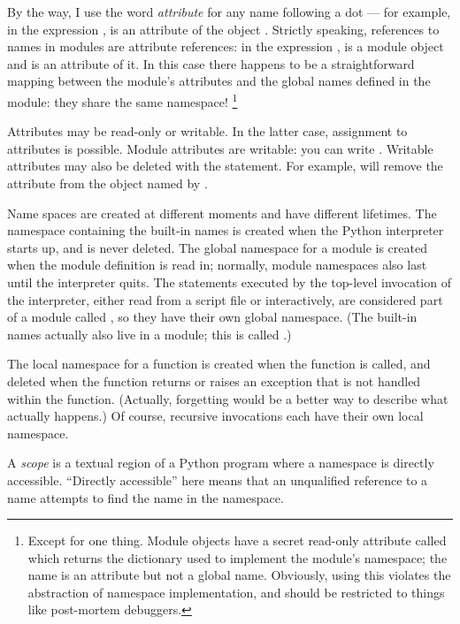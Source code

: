 \documentclass{manual}
\begin{document}
By the way, I use the word \emph{attribute} for any name following a
dot --- for example, in the expression ,  is
an attribute of the object .  Strictly speaking, references to
names in modules are attribute references: in the expression
,  is a module object and
 is an attribute of it.  In this case there happens to
be a straightforward mapping between the module's attributes and the
global names defined in the module: they share the same namespace!
\footnote{
        Except for one thing.  Module objects have a secret read-only
        attribute called  which returns the dictionary
        used to implement the module's namespace; the name
         is an attribute but not a global name.
        Obviously, using this violates the abstraction of namespace
        implementation, and should be restricted to things like
        post-mortem debuggers.
}

Attributes may be read-only or writable.  In the latter case,
assignment to attributes is possible.  Module attributes are writable:
you can write .  Writable attributes may
also be deleted with the  statement.  For example,
 will remove the attribute
 from the object named by .

Name spaces are created at different moments and have different
lifetimes.  The namespace containing the built-in names is created
when the Python interpreter starts up, and is never deleted.  The
global namespace for a module is created when the module definition
is read in; normally, module namespaces also last until the
interpreter quits.  The statements executed by the top-level
invocation of the interpreter, either read from a script file or
interactively, are considered part of a module called
, so they have their own global namespace.  (The
built-in names actually also live in a module; this is called
.)

The local namespace for a function is created when the function is
called, and deleted when the function returns or raises an exception
that is not handled within the function.  (Actually, forgetting would
be a better way to describe what actually happens.)  Of course,
recursive invocations each have their own local namespace.

A \emph{scope} is a textual region of a Python program where a
namespace is directly accessible.  ``Directly accessible'' here means
that an unqualified reference to a name attempts to find the name in
the namespace.
\end{document}

